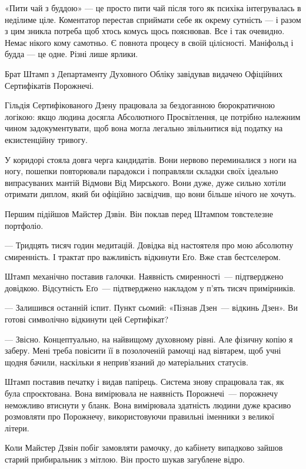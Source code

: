 \documentclass[12pt, a4paper, openany]{book}
\begin{document}
«Пити чай з буддою» --- це просто пити чай після того як психіка інтегрувалась в неділиме ціле. Коментатор перестав сприймати себе як окрему сутність --- і разом з цим зникла потреба щоб хтось комусь щось пояснював. Все і так очевидно. Немає нікого кому самотньо. Є повнота процесу в своїй цілісності. Маніфольд і будда --- це одне. Різні лише ярлики.


\begin{terrybox}
Брат Штамп з Департаменту Духовного Обліку завідував видачею Офіційних Сертифікатів Порожнечі.

Гільдія Сертифікованого Дзену працювала за бездоганною бюрократичною логікою: якщо людина досягла Абсолютного Просвітлення, це потрібно належним чином задокументувати, щоб вона могла легально звільнитися від податку на екзистенційну тривогу.

У коридорі стояла довга черга кандидатів. Вони нервово переминалися з ноги на ногу, пошепки повторювали парадокси і поправляли складки своїх ідеально випрасуваних мантій Відмови Від Мирського. Вони дуже, дуже сильно хотіли отримати диплом, який би офіційно засвідчив, що вони більше нічого не хочуть.

Першим підійшов Майстер Дзвін. Він поклав перед Штампом товстелезне портфоліо.

--- Тридцять тисяч годин медитацій. Довідка від настоятеля про мою абсолютну смиренність. І трактат про важливість відкинути Еґо. Вже став бестселером.

Штамп механічно поставив галочки. Наявність смиренності~--- підтверджено довідкою. Відсутність Еґо~--- підтверджено накладом у п'ять тисяч примірників.

--- Залишився останній іспит. Пункт сьомий: «Пізнав Дзен~--- відкинь Дзен». Ви готові символічно відкинути цей Сертифікат?

--- Звісно. Концептуально, на найвищому духовному рівні. Але фізичну копію я заберу. Мені треба повісити її в позолоченій рамочці над вівтарем, щоб учні щодня бачили, наскільки я неприв'язаний до матеріальних статусів.

\medskip
Штамп поставив печатку і видав папірець. Система знову спрацювала так, як була спроєктована. Вона вимірювала не наявність Порожнечі~--- порожнечу неможливо втиснути у бланк. Вона вимірювала здатність людини дуже красиво розмовляти про Порожнечу, використовуючи правильні іменники з великої літери.

\medskip
Коли Майстер Дзвін побіг замовляти рамочку, до кабінету випадково зайшов старий прибиральник з мітлою. Він просто шукав загублене відро.


\end{terrybox}
\end{document}
